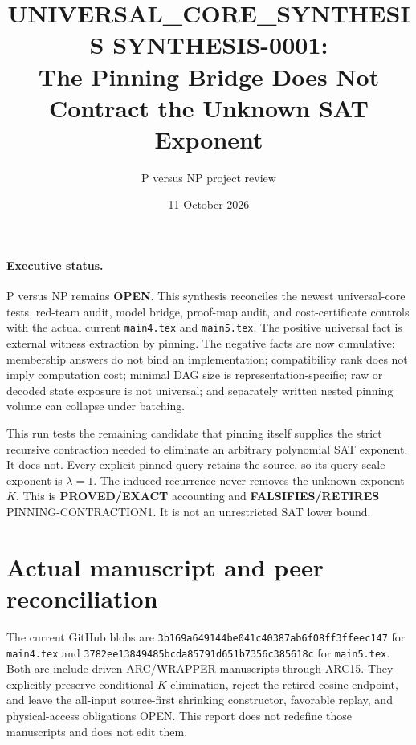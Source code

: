 \documentclass[11pt]{article}
\title{UNIVERSAL\_CORE\_SYNTHESIS SYNTHESIS-0001:\\
The Pinning Bridge Does Not Contract the Unknown SAT Exponent}
\author{P versus NP project review}
\date{11 October 2026}
\begin{document}
\maketitle

\paragraph{Executive status.}
P versus NP remains \textbf{OPEN}.  This synthesis reconciles the newest
universal-core tests, red-team audit, model bridge, proof-map audit, and
cost-certificate controls with the actual current \texttt{main4.tex} and
\texttt{main5.tex}.  The positive universal fact is external witness
extraction by pinning.  The negative facts are now cumulative: membership
answers do not bind an implementation; compatibility rank does not imply
computation cost; minimal DAG size is representation-specific; raw or decoded
state exposure is not universal; and separately written nested pinning volume
can collapse under batching.

This run tests the remaining candidate that pinning itself supplies the
strict recursive contraction needed to eliminate an arbitrary polynomial SAT
exponent.  It does not.  Every explicit pinned query retains the source, so
its query-scale exponent is $\lambda=1$.  The induced recurrence never removes
the unknown exponent $K$.  This is \textbf{PROVED/EXACT} accounting and
\textbf{FALSIFIES/RETIRES} \textsf{PINNING-CONTRACTION1}.  It is not an
unrestricted SAT lower bound.

\section{Actual manuscript and peer reconciliation}
The current GitHub blobs are
\nolinkurl{3b169a649144be041c40387ab6f08ff3ffeec147} for
\texttt{main4.tex} and
\nolinkurl{3782ee13849485bcda85791d651b7356c385618c} for
\texttt{main5.tex}.  Both are include-driven ARC/WRAPPER manuscripts through
ARC15.  They explicitly preserve conditional $K$ elimination, reject the
retired cosine endpoint, and leave the all-input source-first shrinking
constructor, favorable replay, and physical-access obligations OPEN.  This
report does not redefine those manuscripts and does not edit them.
\end{document}
